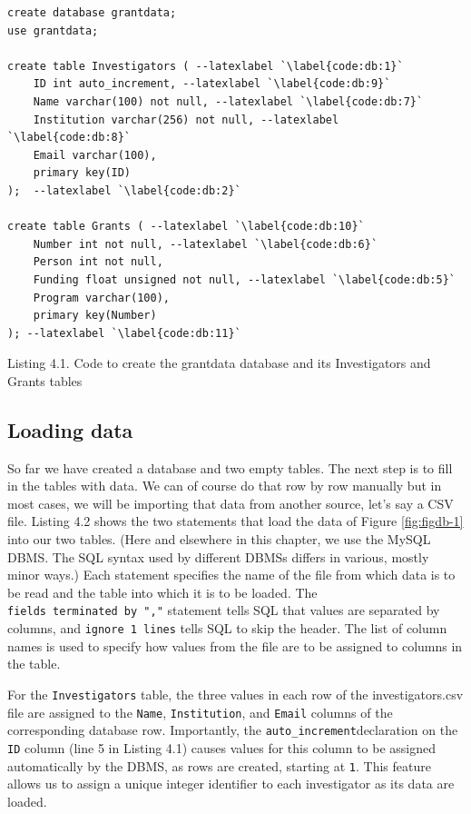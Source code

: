 \documentclass[]{krantz}
\begin{document}
\hypertarget{fig:db:create}{\label{fig:db:create}}
\begin{verbatim}
create database grantdata;
use grantdata;

create table Investigators ( --latexlabel `\label{code:db:1}`
    ID int auto_increment, --latexlabel `\label{code:db:9}`
    Name varchar(100) not null, --latexlabel `\label{code:db:7}`
    Institution varchar(256) not null, --latexlabel `\label{code:db:8}`
    Email varchar(100),
    primary key(ID)
);  --latexlabel `\label{code:db:2}`

create table Grants ( --latexlabel `\label{code:db:10}`
    Number int not null, --latexlabel `\label{code:db:6}`
    Person int not null,
    Funding float unsigned not null, --latexlabel `\label{code:db:5}`
    Program varchar(100),
    primary key(Number)
); --latexlabel `\label{code:db:11}`
\end{verbatim}

Listing 4.1. Code to create the grantdata database and its Investigators
and Grants tables

\subsection{Loading data}\label{loading-data}

So far we have created a database and two empty tables. The next step is
to fill in the tables with data. We can of course do that row by row
manually but in most cases, we will be importing that data from another
source, let's say a CSV file. Listing 4.2 shows the two statements that
load the data of Figure \ref{fig:figdb-1} into our two tables. (Here and
elsewhere in this chapter, we use the MySQL DBMS. The SQL syntax used by
different DBMSs differs in various, mostly minor ways.) Each statement
specifies the name of the file from which data is to be read and the
table into which it is to be loaded. The
\texttt{fields\ terminated\ by\ ","} statement tells SQL that values are
separated by columns, and \texttt{ignore\ 1\ lines} tells SQL to skip
the header. The list of column names is used to specify how values from
the file are to be assigned to columns in the table.

For the \texttt{Investigators} table, the three values in each row of
the investigators.csv file are assigned to the \texttt{Name},
\texttt{Institution}, and \texttt{Email} columns of the corresponding
database row. Importantly, the \texttt{auto\_increment}declaration on
the \texttt{ID} column (line 5 in Listing 4.1) causes values for this
column to be assigned automatically by the DBMS, as rows are created,
starting at \texttt{1}. This feature allows us to assign a unique
integer identifier to each investigator as its data are loaded.
\end{document}
